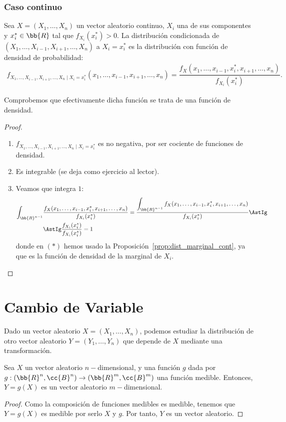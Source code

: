 \subsubsection{Caso continuo}
\begin{definicion}
    Sea $X=(X_1, \ldots, X_n)$ un vector aleatorio continuo, $X_i$ una de sus componentes y $x_i^\ast\in \bb{R}$ tal que $f_{X_i}(x_i^\ast)>0$. La distribución condicionada de $(X_1, \ldots, X_{i-1}, X_{i+1}, \ldots, X_n)$ a $X_i=x_i^\ast$ es la distribución con función de densidad de probabilidad:
    \begin{align*}
        f_{X_1, \ldots, X_{i-1}, X_{i+1}, \ldots, X_n \mid X_i=x_i^\ast}(x_1, \ldots, x_{i-1}, x_{i+1}, \ldots, x_n) =
        \dfrac{f_X(x_1, \ldots, x_{i-1}, x_i^\ast, x_{i+1}, \ldots, x_n)}{f_{X_i}(x_i^\ast)}.
    \end{align*}
\end{definicion}

Comprobemos que efectivamente dicha función se trata de una función de densidad.
\begin{proof}~
    \begin{enumerate}
        \item $f_{X_1, \ldots, X_{i-1}, X_{i+1}, \ldots, X_n \mid X_i=x_i^\ast}$ es no negativa, por ser cociente de funciones de densidad.
        \item Es integrable (se deja como ejercicio al lector).
        \item Veamos que integra $1$:
        \begin{align*}
            \int_{\bb{R}^{n-1}}& \dfrac{f_X(x_1, \ldots, x_{i-1}, x_i^\ast, x_{i+1}, \ldots, x_n)}{f_{X_i}(x_i^\ast)} 
            = \dfrac{\displaystyle \int_{\bb{R}^{n-1}} f_X(x_1, \ldots, x_{i-1}, x_i^\ast, x_{i+1}, \ldots, x_n)}{f_{X_i}(x_i^\ast)} 
            \AstIg \\ &\AstIg
            \dfrac{f_{X_i}(x_i^\ast)}{f_{X_i}(x_i^\ast)} = 1
        \end{align*}
        donde en $(\ast)$ hemos usado la Proposición~\ref{prop:dist_marginal_cont}, ya que es la función de densidad de la marginal de $X_i$.
    \end{enumerate}
\end{proof}


\section{Cambio de Variable}

Dado un vector aleatorio $X=(X_1, \ldots, X_n)$, podemos estudiar la distribución de otro vector aleatorio $Y=(Y_1, \ldots, Y_n)$ que depende de $X$ mediante una transformación.
\begin{prop}
    Sea $X$ un vector aleatorio $n-$dimensional, y una función $g$ dada por $g:\left(\bb{R}^n,\cc{B}^n\right)\to \left(\bb{R}^m,\cc{B}^m\right)$ una función medible. Entonces, $Y=g(X)$ es un vector aleatorio $m-$dimensional.
\end{prop}
\begin{proof}
    Como la composición de funciones medibles es medible, tenemos que $Y=g(X)$ es medible por serlo $X$ y $g$. Por tanto, $Y$ es un vector aleatorio.
\end{proof}

